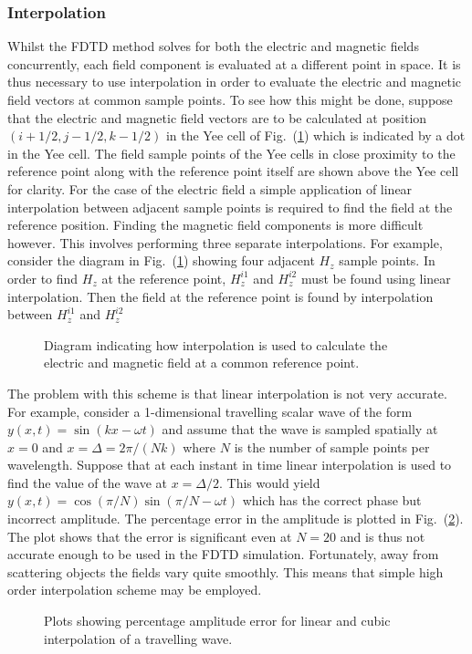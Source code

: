 \documentclass[a4paper, 12pt]{article}
\newcommand{\rfig}[1]{Fig.\ (\ref{#1})}
\begin{document}
	\subsubsection{Interpolation}
	Whilst the FDTD method solves for both the electric and magnetic
	fields concurrently, each field component is evaluated at a different
	point in space. It is thus necessary to use interpolation in order to
	evaluate the electric and magnetic field vectors at common sample
	points. To see how this might be done, suppose that the electric and
	magnetic field vectors are to be calculated at position
	$(i+1/2,j-1/2,k-1/2)$ in the Yee cell of
	\rfig{fig:fdtd:yeeinterp} which is indicated by a dot in the Yee
	cell. The field sample points of the Yee cells in close proximity to
	the reference point along with the reference point itself are shown above the Yee cell for clarity.  For the
	case of the electric field a simple application of linear
	interpolation between adjacent sample points is required to find the
	field at the reference position. Finding the magnetic field components
	is more difficult however. This involves performing three separate
	interpolations. For example, consider the diagram in
	\rfig{fig:fdtd:yeeinterp} showing four adjacent $H_z$ sample
	points. In order to find $H_z$ at the reference point, $H^{i1}_{z}$
	and $H^{i2}_z$ must be found using linear interpolation. Then the
	field at the reference point is found by interpolation between
	$H^{i1}_{z}$ and $H^{i2}_z$  
	\begin{figure}[!h]
		\centering
		\caption{Diagram indicating how interpolation is used to calculate
			the electric and magnetic field at a common reference point.}
		\label{fig:fdtd:yeeinterp}
	\end{figure}
	
	The problem with this scheme is that linear interpolation is not very
	accurate. For example, consider a 1-dimensional travelling scalar wave
	of the form $y(x,t) = \sin(kx-\omega t)$ and assume that the wave is
	sampled spatially at $x=0$ and $x=\Delta=2\pi/(Nk)$ where $N$ is the
	number of sample points per wavelength. Suppose that at
	each instant in time linear interpolation is used to find the value of
	the wave at $x=\Delta/2$. This would yield
	$y(x,t)=\cos(\pi/N)\sin(\pi/N-\omega t)$ which has the correct phase
	but incorrect amplitude. The percentage error in the amplitude is
	plotted in \rfig{fig:fdtd:linearerror}. The plot shows that the error
	is significant even at $N=20$ and is thus not accurate enough to be
	used in the FDTD simulation. Fortunately, away from scattering objects
	the fields vary quite smoothly. This means that simple high order
	interpolation scheme may be employed. 
	\begin{figure}[!h]
		\centering
		\caption{Plots showing percentage amplitude error for linear and
			cubic interpolation of a travelling wave.}
		\label{fig:fdtd:linearerror}
	\end{figure}
	
\end{document}
